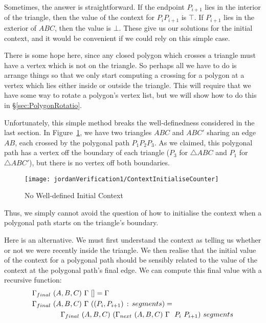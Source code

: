 Sometimes, the answer is straightforward. If the endpoint $P_{i+1}$ lies in the interior of the triangle, then the value of the context for $P_iP_{i+1}$ is $\top$. If $P_{i+1}$ lies in the exterior of $ABC$, then the value is $\bot$. These give us our solutions for the initial context, and it would be convenient if we could rely on this simple case.

There is some hope here, since any closed polygon which crosses a triangle must have a vertex which is not on the triangle. So perhaps all we have to do is arrange things so that we only start computing a crossing for a polygon at a vertex which lies either inside or outside the triangle. This will require that we have some way to rotate a polygon's vertex list, but we will show how to do this in \S\ref{sec:PolygonRotatio}.

Unfortunately, this simple method breaks the well-definedness considered in the last section. In Figure~\ref{fig:ContextInitialiseCounter}, we have two triangles $ABC$ and $ABC'$ sharing an edge $AB$, each crossed by the polygonal path $P_1P_2P_3$. As we claimed, this polygonal path has a vertex off the boundary of each triangle ($P_3$ for $\triangle ABC$ and $P_1$ for $\triangle ABC'$), but there is no vertex off both boundaries. 

\begin{figure}
\centering\texttt{[image: jordanVerification1/ContextInitialiseCounter]}
\caption{No Well-defined Initial Context}\label{fig:ContextInitialiseCounter}
\end{figure}

Thus, we simply cannot avoid the question of how to initialise the context when a polygonal path starts on the triangle's boundary. 

Here is an alternative. We must first understand the context as telling us whether or not we were recently inside the triangle. We then realise that the initial value of the context for a polygonal path should be sensibly related to the value of the context at the polygonal path's final edge. We can compute this final value with a recursive function:
\begin{equation}
\begin{aligned}
&\Gamma_{final}\ (A,B,C)\ \Gamma\ [] = \Gamma\\
&\Gamma_{final}\ (A,B,C)\ \Gamma\ ((P_i,P_{i+1})\,:\,segments) = \\
&\qquad\qquad\Gamma_{final}\ (A,B,C)\ (\Gamma_{next}\ (A,B,C)\ \Gamma\ \ P_i\ P_{i+1})\ segments
\end{aligned}
\end{equation}

